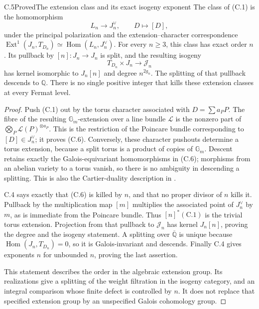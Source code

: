 \begin{statement}{C.5}{Proved}{The extension class and its exact isogeny exponent}
The class of (C.1) is the homomorphism
\[
 L_n\longrightarrow J_n^\vee,\qquad D\longmapsto[D],
                                                               \tag{C.6}
\]
under the principal polarization and the extension--character
correspondence
\(\operatorname{Ext}^1(J_n,T_{D_n})
 \simeq\operatorname{Hom}(L_n,J_n^\vee)\).
For every \(n\ge3\), this class has exact order \(n\).
Its pullback by \([n]:J_n\to J_n\) is split, and the resulting
isogeny
\[
 T_{D_n}\times J_n\longrightarrow\mathcal J_n
\]
has kernel isomorphic to \(J_n[n]\) and degree \(n^{2g_n}\).
The splitting of that pullback descends to \(\mathbb Q\).
There is no single positive integer that kills these extension
classes at every Fermat level.
\end{statement}
\begin{proof}
Push (C.1) out by the torus character associated with
\(D=\sum a_PP\). The fibre of the resulting \(\mathbb G_m\)-extension
over a line bundle \(\mathcal L\) is the nonzero part of
\(\bigotimes_P\mathcal L(P)^{\otimes a_P}\).
This is the restriction of the Poincare bundle corresponding
to \([D]\in J_n^\vee\); it proves (C.6).
Conversely, these character pushouts determine a torus extension,
because a split torus is a product of copies of \(\mathbb G_m\).
Descent retains exactly the Galois-equivariant homomorphisms in
(C.6); morphisms from an abelian variety to a torus vanish,
so there is no ambiguity in descending a splitting.
This is also the Cartier-duality description in
\cite[10.2.11--10.2.12]{DeligneHodgeIII}.

C.4 says exactly that (C.6) is killed by \(n\), and that no
proper divisor of \(n\) kills it. Pullback by the multiplication
map \([m]\) multiplies the associated point of \(J_n^\vee\)
by \(m\), as is immediate from the Poincare bundle. Thus
\([n]^*(\text{C.1})\) is the trivial torus extension.
Projection from that pullback to \(\mathcal J_n\) has kernel
\(J_n[n]\), proving the degree and the isogeny statement.
A splitting over \(\overline{\mathbb Q}\) is unique because
\(\operatorname{Hom}(J_n,T_{D_n})=0\), so it is Galois-invariant
and descends. Finally C.4 gives exponents \(n\) for unbounded
\(n\), proving the last assertion.

This statement describes the order in the algebraic extension
group. Its realizations give a splitting of the weight
filtration in the isogeny category, and an integral comparison
whose finite defect is controlled by \(n\). It does not replace
that specified extension group by an unspecified Galois
cohomology group.
\end{proof}

